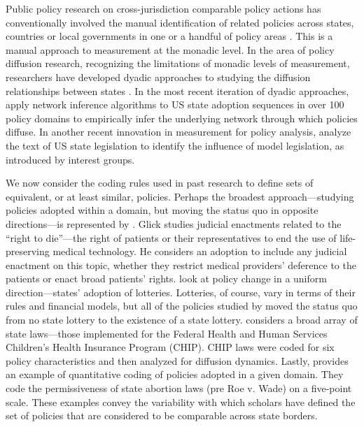 \documentclass[12pt]{article} %
\begin{document}
Public policy research on cross-jurisdiction comparable policy actions has conventionally involved the manual identification of related policies across states, countries or local governments in one or a handful of policy areas \citep[e.g., ][]{walker1969,berry1990,simmons2004,gilardi2009,krause2011policy}. This is a manual approach to measurement at the monadic level. In the area of policy diffusion research, recognizing the limitations of monadic levels of measurement, researchers have developed dyadic approaches to studying the diffusion relationships between states \citep{volden2006,boehmke2009}. In the most recent iteration of dyadic approaches, \cite{desmarais2015} apply network inference algorithms to US state adoption sequences in over 100 policy domains to empirically infer the underlying network through which policies diffuse. In another recent innovation in measurement for policy analysis, \cite{garrett2015} analyze the text of US state legislation to identify the influence of model legislation, as introduced by interest groups.
 
We now consider the coding rules used in past research to define sets of equivalent, or at least similar, policies. Perhaps the broadest approach---studying policies adopted within a domain, but moving the status quo in opposite directions---is represented by \citet{glick1992judicial}. Glick studies judicial enactments related to the ``right to die''---the right of patients or their representatives to end the use of life-preserving medical technology. He considers an adoption to include any judicial enactment on this topic, whether they restrict medical providers' deference to the patients or enact broad patients' rights.  \citet{berry1990} look at policy change in a uniform direction---states' adoption of lotteries. Lotteries, of course, vary in terms of their rules and financial models, but all of the policies studied by \citet{berry1990} moved the status quo from no state lottery to the existence of a state lottery. \citet{volden2006} considers a broad array of state laws---those implemented for the Federal Health and Human Services Children's Health Insurance Program (CHIP). CHIP laws were coded for six policy characteristics and then analyzed for diffusion dynamics. Lastly, \citet{mooney1995legislative} provides an example of quantitative coding of policies adopted in a given domain. They code the permissiveness of state abortion laws (pre Roe v. Wade) on a five-point scale. These examples convey the variability with which scholars have defined the set of policies that are considered to be comparable across state borders.
\end{document}
